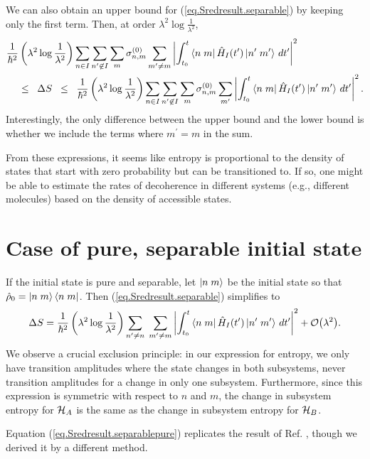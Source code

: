 We can also obtain an upper bound for (\ref{eq.Sredresult.separable}) by keeping only the first term. Then, at order \(\lambda^2 \log \frac{1}{\lambda^2}\),
\begin{align}\label{eq.dSbounds}
\frac{1}{\hbar^2}&\left(\lambda^2 \log\frac{1}{\lambda^2}\right) \sum_{n\in I}\sum_{n^\prime \not\in I} \sum_m \sigma_{n,m}^{(0)} \sum_{m^\prime \neq m} \left|\int_{t_0}^t \left\langle n\;m\right|\hat{H}_I (t^{\prime})\left|n^\prime\;m^\prime\right\rangle \,dt^{\prime}\right|^2 \\
&\leq \;\;\Delta S \;\;\leq\;\; \frac{1}{\hbar^2}\left(\lambda^2 \log\frac{1}{\lambda^2}\right) \sum_{n\in I}\sum_{n^\prime \not\in I} \sum_m \sigma_{n,m}^{(0)} \sum_{m^\prime} \left|\int_{t_0}^t \left\langle n\;m\right|\hat{H}_I (t^{\prime})\left|n^\prime\;m^\prime\right\rangle \,dt^{\prime}\right|^2. \nonumber
\end{align}
Interestingly, the only difference between the upper bound and the lower bound is whether we include the terms where \(m^\prime = m\) in the sum.

From these expressions, it seems like entropy is proportional to the density of states that start with zero probability but can be transitioned to. If so, one might be able to estimate the rates of decoherence in different systems (e.g., different molecules) based on the density of accessible states.

\section{Case of pure, separable initial state}\label{sec.purestate}

If the initial state is pure and separable, let \(\left|n\;m\right\rangle\) be the initial state so that \(\hat{\rho}_0 = \left|n\;m\right\rangle\left\langle n\;m\right|\). Then (\ref{eq.Sredresult.separable}) simplifies to
\begin{equation}\label{eq.Sredresult.separablepure}
\Delta S =\frac{1}{\hbar^2}\left(\lambda^2 \log\frac{1}{\lambda^2}\right) \sum_{n^\prime\neq n} \;\sum_{m^\prime\neq m} \left|\int_{t_0}^t \left\langle n\;m\right| \hat{H}_I (t^{\prime})\left|n^\prime\;m^\prime\right\rangle \,dt^{\prime}\right|^2 + \mathcal{O}{\left(\lambda^2\right)}.
\end{equation}
We observe a crucial exclusion principle: in our expression for entropy, we only have transition amplitudes where the state changes in both subsystems, never transition amplitudes for a change in only one subsystem. Furthermore, since this expression is symmetric with respect to \(n\) and \(m\), the change in subsystem entropy for \(\mathcal{H}_A\) is the same as the change in subsystem entropy for \(\mathcal{H}_B\).

Equation (\ref{eq.Sredresult.separablepure}) replicates the result of Ref. \cite{seki}, though we derived it by a different method.
